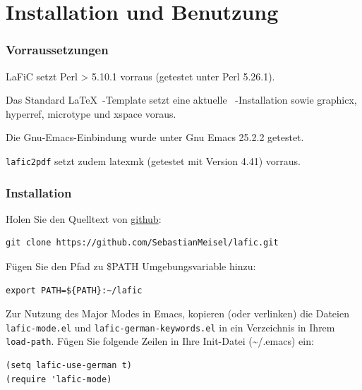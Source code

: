 \documentclass{scrartcl}
\begin{document}
\part{Installation und Benutzung}

\section{Vorraussetzungen}

{LaFiC setzt Perl > 5.10.1 vorraus (getestet unter Perl 5.26.1).\\}

{Das Standard \LaTeX\ -Template setzt eine aktuelle
\XeLaTeX\ -Installation sowie graphicx, hyperref, microtype und
xspace voraus.\\}

{Die Gnu-Emacs-Einbindung wurde unter Gnu Emacs 25.2.2 getestet.\\}

{\texttt{lafic2pdf} setzt zudem latexmk (getestet mit Version 4.41) vorraus.\\}

\section{Installation}
\label{Installation}

{Holen Sie den Quelltext von \href{https://github.com}{github}:\\}

\begin{verbatim}
git clone https://github.com/SebastianMeisel/lafic.git
\end{verbatim}


{Fügen Sie den Pfad zu \$PATH Umgebungsvariable hinzu:\\}

\begin{verbatim}
export PATH=${PATH}:~/lafic
\end{verbatim}


{Zur Nutzung des Major Modes in Emacs, kopieren (oder
verlinken) die Dateien \texttt{lafic-mode.el} und
\texttt{lafic-german-keywords.el} in ein Verzeichnis in Ihrem
\texttt{load-path}. Fügen Sie folgende Zeilen in Ihre Init-Datei
(\textasciitilde /.emacs) ein:\\}

\begin{verbatim}
(setq lafic-use-german t)
(require 'lafic-mode)
\end{verbatim}
\end{document}
